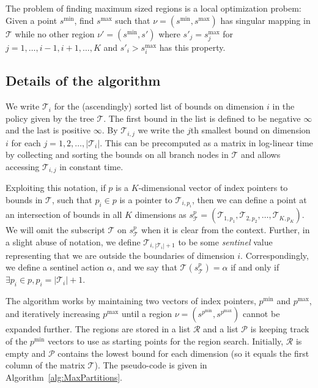 The problem of finding maximum sized regions is a local optimization probem:
Given a point $s^{\min}$, find $s^{\max}$ such that $\nu = (s^{\min},
s^{\max})$ has singular mapping in $\mathcal{T}$ while no other region $\nu' =
(s^{\min}, s')$ where $s'_j = s^{\max}_j$ for $j = 1,\ldots,i-1,i+1,\ldots,K$
and $s'_i > s^{\max}_i$ has this property.


\subsection{Details of the algorithm}%
\label{sub:maxPartsDescription}

We write $\mathcal{T}_i$ for the (ascendingly) sorted list of bounds on
dimension $i$ in the policy given by the tree $\mathcal{T}$. The first bound in
the list is defined to be negative $\infty$ and the last is positive $\infty$.
By $\mathcal{T}_{i,j}$ we write the $j$th smallest bound on dimension $i$ for
each $j = 1, 2, \ldots, |\mathcal{T}_i|$. This can be precomputed as a matrix in
log-linear time by collecting and sorting the bounds on all branch nodes in
$\mathcal{T}$ and allows accessing $\mathcal{T}_{i,j}$ in constant time.

Exploiting this notation, if $p$ is a $K$-dimensional vector of index pointers
to bounds in $\mathcal{T}$, such that $p_i \in p$ is a pointer to
$\mathcal{T}_{i,p_i}$, then we can define a point at an intersection of bounds
in all $K$ dimensions as $s^{p}_{\mathcal{T}} = (\mathcal{T}_{1,p_1},
\mathcal{T}_{2,p_2}, \ldots, \mathcal{T}_{K,p_K})$. We will omit the subscript
$\mathcal{T}$ on $s^{p}_{\mathcal{T}}$ when it is clear from the context.
Further, in a slight abuse of notation, we define $\mathcal{T}_{i,
|\mathcal{T}_i| + 1}$ to be some \textit{sentinel} value representing that we
are outside the boundaries of dimension $i$.  Correspondingly, we define a
sentinel action $\alpha$, and we say that $\mathcal{T}(s^p_{\mathcal{T}}) =
\alpha$ if and only if $\exists p_i \in p, p_i = |\mathcal{T}_i| + 1$.

The algorithm works by maintaining two vectors of index pointers, $p^{\min}$ and
$p^{\max}$, and iteratively increasing $p^{\max}$ until a region $\nu =
(s^{p^{\min}}, s^{p^{\max}})$ cannot be expanded further. The regions are stored
in a list $\mathcal{R}$ and a list $\mathcal{P}$ is keeping track of the
$p^{\min}$ vectors to use as starting points for the region search. Initially,
$\mathcal{R}$ is empty and $\mathcal{P}$ contains the lowest bound for each
dimension (so it equals the first column of the matrix $\mathcal{T}$). The
pseudo-code is given in Algorithm~\ref{alg:MaxPartitions}.

